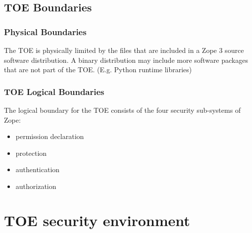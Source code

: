 \documentclass[12pt,english]{scrbook}
\begin{document}



\section{TOE Boundaries}





\subsection{Physical Boundaries}

The TOE is physically limited by the files that are included in a Zope 3
source software distribution. A binary distribution may include more software
packages that are not part of the TOE. (E.g. Python runtime libraries)





\subsection{TOE Logical Boundaries}

The logical boundary for the TOE consists of the four security sub-systems of
Zope:
\begin{itemize}
\item {} 
permission declaration

\item {} 
protection

\item {} 
authentication

\item {} 
authorization

\end{itemize}





\chapter{TOE security environment}


\end{document}
